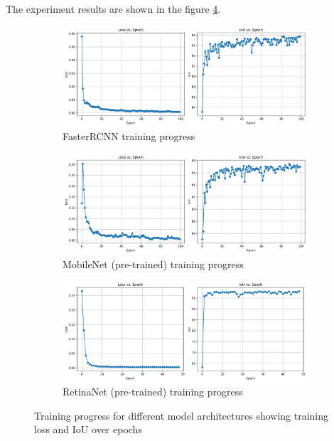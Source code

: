 \documentclass[conference]{IEEEtran}
\begin{document}
The experiment results are shown in the figure \ref{fig:training_progress_detection}.

\begin{figure}[h]
    \centering
    \begin{subfigure}[b]{0.45\textwidth}
      \centering
      \includegraphics[width=\textwidth]{images/File5_FasterRCNN_training_progress.png}
      \caption{FasterRCNN training progress}
      \label{fig:progress_fasterrcnn}
    \end{subfigure}
    \hfill
    \begin{subfigure}[b]{0.45\textwidth}
      \centering
      \includegraphics[width=\textwidth]{images/File5_MobileNet_training_progress copy.png}
      \caption{MobileNet (pre-trained) training progress}
      \label{fig:progress_mobilenet}
    \end{subfigure}    
    \vspace{0.5cm}
    \begin{subfigure}[b]{0.45\textwidth}
      \centering
      \includegraphics[width=\textwidth]{images/File5_RetinaNet_training_progress.png}
      \caption{RetinaNet (pre-trained) training progress}
      \label{fig:progress_retinanet}
    \end{subfigure}
    \caption{Training progress for different model architectures showing training loss and IoU over epochs}
    \label{fig:training_progress_detection}
\end{figure}
\end{document}
